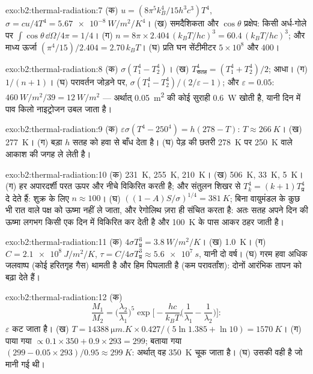 \begin{solution}{exo:b2:thermal-radiation:7}
(क) $u = (8\pi^5k_B^4/15h^3c^3)T^4$, $\sigma = cu/4T^4 = \qty{5.67e-8}{W/m^2/K^4}$।
(ख) समदैशिकता और $\cos\theta$ प्रक्षेप: किसी अर्ध-गोले पर $\int\cos\theta\,\dd\Omega/4\pi = 1/4$।
(ग) $n = 8\pi \times 2.404\,(k_BT/hc)^3 = 60.4\,(k_BT/hc)^3$;
और माध्य ऊर्जा $(\pi^4/15)/2.404 = 2.70\,k_BT$। (घ) प्रति घन सेंटीमीटर $5 \times 10^8$ और $400$।
\end{solution}

\begin{solution}{exo:b2:thermal-radiation:8}
(क) $\sigma(T_1^4 - T_2^4)$। (ख) $T_{\text{सतह}}^4 = (T_1^4 + T_2^4)/2$; आधा। (ग)
$1/(n + 1)$। (घ) परावर्तन जोड़ने पर, $\sigma(T_1^4 - T_2^4)/(2/\varepsilon -
1)$; और $\varepsilon = 0.05$: $\qty{460}{W/m^2}/39 = \qty{12}{W/m^2}$ --- अर्थात्
\qty{0.05}{m^2} की कोई सुराही \qty{0.6}{W} खोती है, यानी दिन में पाव किलो
नाइट्रोजन उबल जाता है।
\end{solution}

\begin{solution}{exo:b2:thermal-radiation:9}
(क) $\varepsilon\sigma(T^4 - 250^4) = h(278 - T)$: $T \approx \qty{266}{K}$। (ख)
\qty{277}{K}। (ग) बड़ा $h$ सतह को हवा से बाँध देता है। (घ) पेड़ की छतरी
\qty{278}{K} पर \qty{250}{K} वाले आकाश की जगह ले लेती है।
\end{solution}

\begin{solution}{exo:b2:thermal-radiation:10}
(क) \qty{231}{K}, \qty{255}{K}, \qty{210}{K}। (ख) \qty{506}{K}, \qty{33}{K}, \qty{5}{K}।
(ग) हर अपारदर्शी परत ऊपर और नीचे विकिरित करती है; और संतुलन शिखर से
$T_k^4 = (k + 1)T_{\text{प्र}}^4$ दे देते हैं: शुक्र के लिए $n \approx 100$। (घ)
$((1 - A)S/\sigma)^{1/4} = \qty{381}{K}$; बिना वायुमंडल के कुछ भी रात वाले पक्ष को
ऊष्मा नहीं ले जाता, और रेगोलिथ ज़रा ही संचित करता है: अतः सतह
अपने दिन की ऊष्मा लगभग किसी एक दिन में विकिरित कर देती है और
\qty{100}{K} के पास आकर ठहर जाती है।
\end{solution}

\begin{solution}{exo:b2:thermal-radiation:11}
(क) $4\sigma T_{\text{प्र}}^3 = \qty{3.8}{W/m^2/K}$। (ख) \qty{1.0}{K}। (ग) $C =
\qty{2.1e8}{J/m^2/K}$, $\tau = C/4\sigma T_{\text{प्र}}^3 \approx \qty{5.6e7}{s}$, यानी दो
वर्ष। (घ) गरम हवा अधिक जलवाष्प (कोई हरितगृह गैस) थामती है और
हिम पिघलाती है (कम परावर्तांश): दोनों आरंभिक तापन को बढ़ा देते हैं।
\end{solution}

\begin{solution}{exo:b2:thermal-radiation:12}
(क)
\[
\frac{M_1}{M_2} = \Big(\frac{\lambda_2}{\lambda_1}\Big)^5\exp\Big[-\frac{hc}{k_BT}\Big(\frac{1}{\lambda_1} - \frac{1}{\lambda_2}\Big)\Big] :
\]
$\varepsilon$ कट जाता है। (ख) $T = \qty{14388}{\micro m.K} \times 0.427/(5\ln 1.385 +
\ln 10) = \qty{1570}{K}$। (ग) पाया गया $\propto 0.1 \times 350 + 0.9 \times 293 =
299$; बताया गया $(299 - 0.05 \times 293)/0.95 \approx \qty{299}{K}$: अर्थात् वह
\qty{350}{K} चूक जाता है। (घ) उसकी  वही है जो मानी गई थी।
\end{solution}


